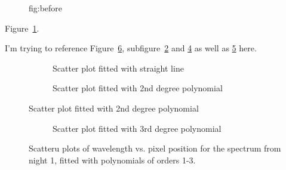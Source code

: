 \documentclass[11pt]{article}
\begin{document}
\begin{figure}
  \caption{fig:before}\label{fig:before}
\end{figure}
Figure~\ref{fig:before}.

I'm trying to reference Figure~\ref{fig:regress}, subfigure~\ref{fig:linfit} and \ref{fig:quadfit} as well as \ref{fig:cubicfit} here.

\hrulefill
\begin{figure}[htp]
  \centering
  \begin{subfigure}{0.8\textwidth}
    \caption{Scatter plot fitted with straight line}
    \label{fig:linfit}
  \end{subfigure}%

  \begin{subfigure}{0.8\textwidth}
    \caption{Scatter plot fitted with 2nd degree polynomial}
    \label{fig:quadfit}
  \end{subfigure}
\end{figure}

\hrulefill
\begin{figure}[htp]
  \ContinuedFloat
  \centering
  \begin{subfigure}{0.8\textwidth}
    \caption{Scatter plot fitted with 3rd degree polynomial} 
    \label{fig:cubicfit}
  \end{subfigure}
  \caption{Scatteru plots of wavelength vs. pixel position for the spectrum from night 1, fitted with polynomials of orders 1-3.}   \label{fig:regress}
\end{figure}
\end{document}
